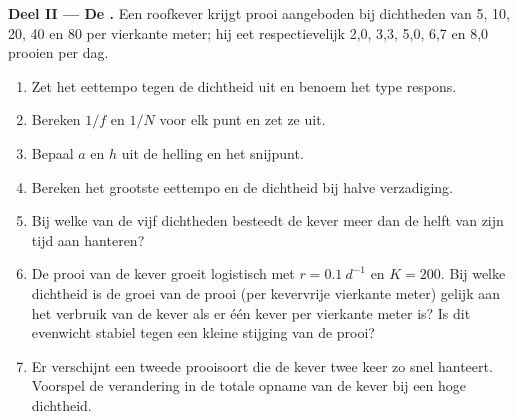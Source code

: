 \begin{problem}
\medskip
\noindent\textbf{Deel II --- De .}
Een roofkever krijgt prooi aangeboden bij dichtheden van 5, 10, 20, 40 en
80 per vierkante meter; hij eet respectievelijk 2,0, 3,3, 5,0, 6,7 en 8,0
prooien per dag.
\begin{enumerate}[resume]
  \item Zet het eettempo tegen de dichtheid uit en benoem het type
        respons.
  \item Bereken $1/f$ en $1/N$ voor elk punt en zet ze uit.
  \item Bepaal $a$ en $h$ uit de helling en het snijpunt.
  \item Bereken het grootste eettempo en de dichtheid bij halve
        verzadiging.
  \item Bij welke van de vijf dichtheden besteedt de kever meer dan de
        helft van zijn tijd aan hanteren?
  \item De prooi van de kever groeit logistisch met $r = \qty{0.1}{d^{-1}}$
        en $K = 200$. Bij welke dichtheid is de groei van de prooi (per
        kevervrije vierkante meter) gelijk aan het verbruik van de kever
        als er één kever per vierkante meter is? Is dit evenwicht stabiel
        tegen een kleine stijging van de prooi?
  \item Er verschijnt een tweede prooisoort die de kever twee keer zo snel
        hanteert. Voorspel de verandering in de totale opname van de kever
        bij een hoge dichtheid.
\end{enumerate}


\end{problem}
